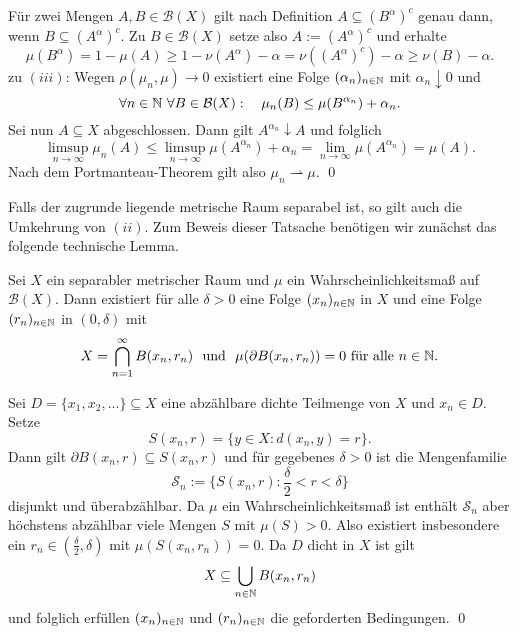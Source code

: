 \begin{proof*}
$$    $$
    Für zwei Mengen $A,B \in \mathcal{B}(X)$ gilt nach Definition $A \subseteq (B^{\alpha})^c$ genau dann, wenn $B \subseteq (A^{\alpha})^c$. 
    Zu $B \in \mathcal{B}(X)$ setze also $A:=(A^{\alpha})^c$ und erhalte 
    $$ 
        \mu(B^{\alpha}) = 1 - \mu(A) \geq 1 - \nu(A^{\alpha}) - \alpha = \nu((A^{\alpha})^c) - \alpha \geq \nu(B) - \alpha. 
    $$
    zu $(iii)$: Wegen $\rho(\mu_n, \mu) \to 0$ existiert eine Folge $(\alpha_n)_{n \in \mathbb{N}}$ mit $\alpha_n \downarrow 0$ und 
    $$
        \forall n \in \mathbb{N} \ \forall B \in \mathcal{B}(X): \quad \mu_n(B) \leq \mu(B^{\alpha_n}) + \alpha_n. 
    $$
    Sei nun $A \subseteq X$ abgeschlossen. Dann gilt $A^{\alpha_n} \downarrow A$ und folglich
    $$
        \limsup_{n \to \infty} \mu_n(A) \leq \limsup_{n \to \infty} \mu(A^{\alpha_n}) + \alpha_n = \lim_{n \to \infty} \mu(A^{\alpha_n}) = \mu(A). 
    $$
    Nach dem Portmanteau-Theorem gilt also $\mu_n \rightharpoonup \mu$. 
    \qed
\end{proof*}
Falls der zugrunde liegende metrische Raum separabel ist, so gilt auch die Umkehrung von $(ii)$. Zum Beweis dieser Tatsache benötigen wir zunächst das folgende technische Lemma. 
\begin{lemma}
    Sei $X$ ein separabler metrischer Raum und $\mu$ ein Wahrscheinlichkeitsmaß auf $\mathcal{B}(X)$. Dann existiert für alle $\delta > 0$ eine Folge $(x_n)_{n \in \mathbb{N}}$ in $X$ und eine Folge $(r_n)_{n \in \mathbb{N}}$ in $(0, \delta)$ mit 
         $$
         X = \bigcap_{n=1}^{\infty}B(x_n, r_n) \ \text{ und } \ \mu(\partial B(x_n, r_n)) = 0 \text{ für alle }n \in \N.
         $$  
\end{lemma}
\begin{proof*}%
    Sei $D = \{x_1, x_2,... \} \subseteq X$ eine abzählbare dichte Teilmenge von $X$ und $x_n \in D$. Setze 
    $$
        S(x_n,r) = \{y \in X: d(x_n,y) = r\}.
    $$
    Dann gilt $\partial B(x_n,r) \subseteq S(x_n,r)$ und für gegebenes $\delta > 0$ ist die Mengenfamilie
    $$
        \mathcal{S}_n := \{S(x_n,r) : \frac{\delta}{2} < r < \delta \}
    $$
    disjunkt und überabzählbar. Da $\mu$ ein Wahrscheinlichkeitsmaß ist enthält $\mathcal{S}_n$ aber höchstens abzählbar viele Mengen $S$ mit $\mu(S) > 0$. 
    Also existiert insbesondere ein $r_n \in (\frac{\delta}{2}, \delta)$ mit $\mu(S(x_n,r_n)) = 0$. Da $D$ dicht in $X$ ist gilt 
    $$
        X \subseteq \bigcup_{n \in  \mathbb{N}}B(x_n, r_n)
    $$
    und folglich erfüllen $(x_n)_{n \in \mathbb{N}}$ und $(r_n)_{n \in \mathbb{N}}$ die geforderten Bedingungen. \qed
\end{proof*}

